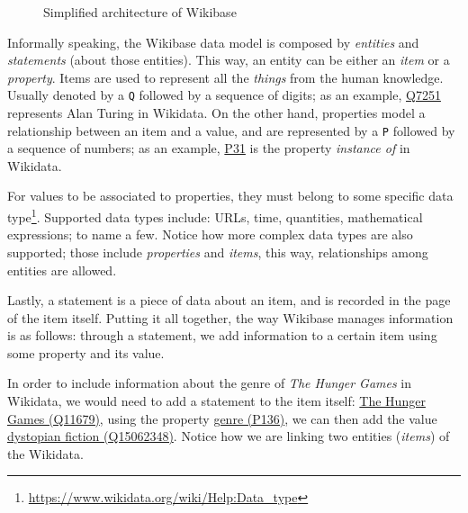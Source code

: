 \begin{figure}[ht]
    \centering
    
    \caption[Simplified architecture of Wikibase]{Simplified architecture of Wikibase~\cite{https://doi.org/10.48550/arxiv.2110.11709}}
    \label{fig:architecture:wikibase}
\end{figure}

Informally speaking, the Wikibase data model is composed by \textit{entities} and \textit{statements} (about those entities). This way, an entity can be either an \textit{item} or a \textit{property}. Items are used to represent all the \textit{things} from the human knowledge. Usually denoted by a \texttt{Q} followed by a sequence of digits; as an example, \href{https://www.wikidata.org/wiki/Q7251}{Q7251} represents Alan Turing in Wikidata. On the other hand, properties model a relationship between an item and a value, and are represented by a \texttt{P} followed by a sequence of numbers; as an example, \href{https://www.wikidata.org/wiki/Property:P31}{P31} is the property \textit{instance of} in Wikidata.

For values to be associated to properties, they must belong to some specific data type\footnote{\url{https://www.wikidata.org/wiki/Help:Data_type}}. Supported data types include: URLs, time, quantities, mathematical expressions; to name a few. Notice how more complex data types are also supported; those include \textit{properties} and \textit{items}, this way, relationships among entities are allowed.

Lastly, a statement is a piece of data about an item, and is recorded in the page of the item itself. Putting it all together, the way Wikibase manages information is as follows: through a statement, we add information to a certain item using some property and its value.

\begin{example}
    \label{example:wikibaseGraph}
    In order to include information about the genre of \textit{The Hunger Games} in Wikidata, we would need to add a statement to the item itself: \href{https://www.wikidata.org/wiki/Q11679}{The Hunger Games (Q11679)}, using the property \href{https://www.wikidata.org/wiki/Property:P136}{genre (P136)}, we can then add the value \href{https://www.wikidata.org/wiki/Q15062348}{dystopian fiction (Q15062348)}. Notice how we are linking two entities (\textit{items}) of the Wikidata.
\end{example}

